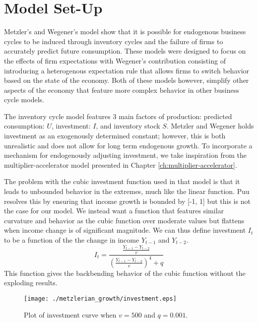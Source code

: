 \section{Model Set-Up}
Metzler's and Wegener's model show that it is possible for endogenous business cycles to be induced through inventory cycles and the failure of firms to accurately predict future consumption. These models were designed to focus on the effects of firm expectations with Wegener's contribution consisting of introducing a heterogenous expectation rule that allows firms to switch behavior based on the state of the economy. Both of these models however, simplify other aspects of the economy that feature more complex behavior in other business cycle models.

The inventory cycle model features 3 main factors of production: predicted consumption: $U$, investment: $I$, and inventory stock $S$. Metzler and Wegener holds investment as an exogenously determined constant; however, this is both unrealistic and does not allow for long term endogenous growth. To incorporate a mechanism for endogenously adjusting investment, we take inspiration from the multiplier-accelerator model presented in Chapter \ref{ch:multiplier-accelerator}. 

The problem with the cubic investment function used in that model is that it leads to unbounded behavior in the extremes, much like the linear function. Puu resolves this by ensuring that income growth is bounded by [-1, 1] but this is not the case for our model. We instead want a function that features similar curvature and behavior as the cubic function over moderate values but flattens when income change is of significant magnitude. We can thus define investment $I_t$ to be a function of the the change in income $Y_{t-1}$ and $Y_{t-2}$.
\begin{equation}
    I_t = \frac{\frac{Y_{t-1}-Y_{t-2}}{v}}{(\frac{Y_{t-1}-Y_{t-2}}{v})^4+q}	
\end{equation}
This function gives the backbending behavior of the cubic function without the exploding results.
\begin{figure}
    \centering
    \texttt{[image: ./metzlerian\_growth/investment.eps]}
    \caption{Plot of investment curve when $v=500$ and $q=0.001$.}
    \label{metzlerian_growth-investment}
\end{figure}

